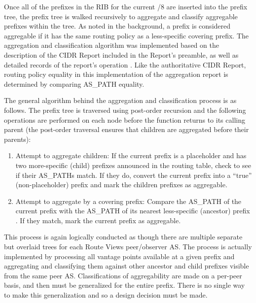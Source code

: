 Once all of the prefixes in the RIB for the current /8 are inserted into the prefix tree, the prefix tree is walked recursively to aggregate and classify aggregable prefixes within the tree. As noted in the background, a prefix is considered aggregable if it has the same routing policy as a less-specific covering prefix. The aggregation and classification algorithm was implemented based on the description of the CIDR Report included in the Report's preamble, as well as detailed records of the report's operation \cite{cidr-report-details}. Like the authoritative CIDR Report, routing policy equality in this implementation of the aggregation report is determined by comparing AS\_PATH equality.

The general algorithm behind the aggregation and classification process is as follows. The prefix tree is traversed using post-order recursion and the following operations are performed on each node before the function returns to its calling parent (the post-order traversal ensures that children are aggregated before their parents):
\begin{enumerate}
\item{Attempt to aggregate children: If the current prefix is a placeholder and has two more-specific (child) prefixes announced in the routing table, check to see if their AS\_PATHs match. If they do, convert the current prefix into a ``true'' (non-placeholder) prefix and mark the children prefixes as aggregable.}
\item{Attempt to aggregate by a covering prefix: Compare the AS\_PATH of the current prefix with the AS\_PATH of its nearest less-specific (ancestor) prefix . If they match, mark the current prefix as aggregable.}
\end{enumerate}

%

This process is again logically conducted as though there are multiple separate but overlaid trees for each Route Views peer/observer AS. The process is actually implemented by processing all vantage points available at a given prefix and aggregating and classifying them against other ancestor and child prefixes visible from the same peer AS. Classifications of aggregability are made on a per-peer basis, and then must be generalized for the entire prefix. There is no single way to make this generalization and so a design decision must be made.

